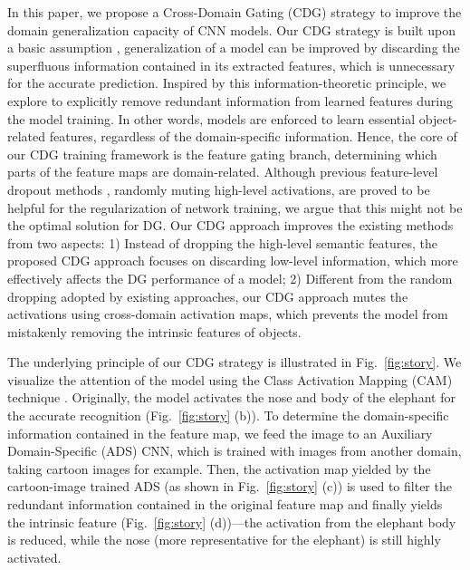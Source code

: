 In this paper, we propose a Cross-Domain Gating (CDG) strategy to improve the domain generalization capacity of CNN models. Our CDG strategy is built upon a basic assumption \citep{tishby2000information}, generalization of a model can be improved by discarding the superfluous information contained in its extracted features, which is unnecessary for the accurate prediction. Inspired by this information-theoretic principle, we explore to explicitly remove redundant information from learned features during the model training. In other words, models are enforced to learn essential object-related features, regardless of the domain-specific information. Hence, the core of our CDG training framework is the feature gating branch, \ie determining which parts of the feature maps are domain-related.
Although previous feature-level dropout methods \citep{tompson2015efficient, ghiasi2018dropblock}, \eg randomly muting high-level activations, are proved to be helpful for the regularization of network training, we argue that this might not be the optimal solution for DG. Our CDG approach improves the existing methods from two aspects: 1) Instead of dropping the high-level semantic features, the proposed CDG approach focuses on discarding low-level information, which more effectively affects the DG performance of a model; 2) Different from the random dropping adopted by existing approaches, our CDG approach mutes the activations using cross-domain activation maps, which prevents the model from mistakenly removing the intrinsic features of objects.

The underlying principle of our CDG strategy is illustrated in Fig.~\ref{fig:story}. We visualize the attention of the model using the Class Activation Mapping (CAM) technique \citep{zhou2016learning}. Originally, the model activates the nose and body of the elephant for the accurate recognition (Fig.~\ref{fig:story} (b)). To determine the domain-specific information contained in the feature map, we feed the image to an Auxiliary Domain-Specific (ADS) CNN, which is trained with images from another domain, taking cartoon images for example. Then, the activation map yielded by the cartoon-image trained ADS (as shown in Fig.~\ref{fig:story} (c)) is used to filter the redundant information contained in the original feature map and finally yields the intrinsic feature (Fig.~\ref{fig:story} (d))---the activation from the elephant body is reduced, while the nose (more representative for the elephant) is still highly activated. 

